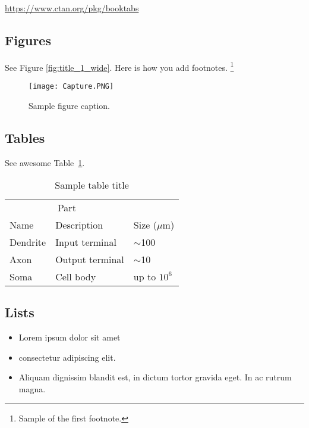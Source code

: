 \documentclass[12pt]{article}
\begin{document}
\begin{center}
  \url{https://www.ctan.org/pkg/booktabs}
\end{center}


\subsection{Figures}
\lipsum[10] 
See Figure \ref{fig:title_1_wide}. Here is how you add footnotes. \footnote{Sample of the first footnote.}
\lipsum[11] 

\begin{figure}[!htb]
  \centering
  \texttt{[image: Capture.PNG]}
  \caption{Sample figure caption.}
  \label{fig:fig1}
\end{figure}

\subsection{Tables}
\lipsum[12]
See awesome Table~\ref{tab:table}.

\begin{table}
 \caption{Sample table title}
  \centering
  \begin{tabular}{lll}
    \toprule
    \multicolumn{2}{c}{Part}                   \\
    \cmidrule(r){1-2}
    Name     & Description     & Size ($\mu$m) \\
    \midrule
    Dendrite & Input terminal  & $\sim$100     \\
    Axon     & Output terminal & $\sim$10      \\
    Soma     & Cell body       & up to $10^6$  \\
    \bottomrule
  \end{tabular}
  \label{tab:table}
\end{table}

\subsection{Lists}
\begin{itemize}
\item Lorem ipsum dolor sit amet
\item consectetur adipiscing elit. 
\item Aliquam dignissim blandit est, in dictum tortor gravida eget. In ac rutrum magna.
\end{itemize}


  


\end{document}
